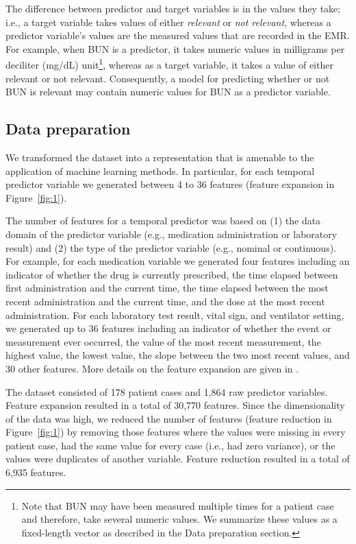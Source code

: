 The difference between predictor and target variables is in the values they take; i.e., a target variable takes values of either \textit{relevant} or \textit{not relevant}, whereas a predictor variable’s values are the measured values that are recorded in the EMR. For example, when BUN is a predictor, it takes numeric values in milligrams per deciliter (mg/dL) unit\footnote{Note that BUN may have been measured multiple times for a patient case and therefore, take several numeric values. We summarize these values as a fixed-length vector as described in the Data preparation section.}, whereas as a target variable, it takes a value of either relevant or not relevant. Consequently, a model for predicting whether or not BUN is relevant may contain numeric values for BUN as a predictor variable.

\subsection{Data preparation}\label{sec:data_prepration}
We transformed the dataset into a representation that is amenable to the application of machine learning methods. In particular, for each temporal predictor variable we generated between 4 to 36 features (feature expansion in Figure~\ref{fig:1}).

The number of features for a temporal predictor was based on (1) the data domain of the predictor variable (e.g., medication administration or laboratory result) and (2) the type of the predictor variable (e.g., nominal or continuous). For example, for each medication variable we generated four features including an indicator of whether the drug is currently prescribed, the time elapsed between first administration and the current time, the time elapsed between the most recent administration and the current time, and the dose at the most recent administration. For each laboratory test result, vital sign, and ventilator setting, we generated up to 36 features including an indicator of whether the event or measurement ever occurred, the value of the most recent measurement, the highest value, the lowest value, the slope between the two most recent values, and 30 other features. More details on the feature expansion are given in \cite{king2018development}.

The dataset consisted of 178 patient cases and 1,864 raw predictor variables. Feature expansion resulted in a total of 30,770 features. Since the dimensionality of the data was high, we reduced the number of features (feature reduction in Figure~\ref{fig:1}) by removing those features where the values were missing in every patient case, had the same value for every case (i.e., had zero variance), or the values were duplicates of another variable. Feature reduction resulted in a total of 6,935 features.

